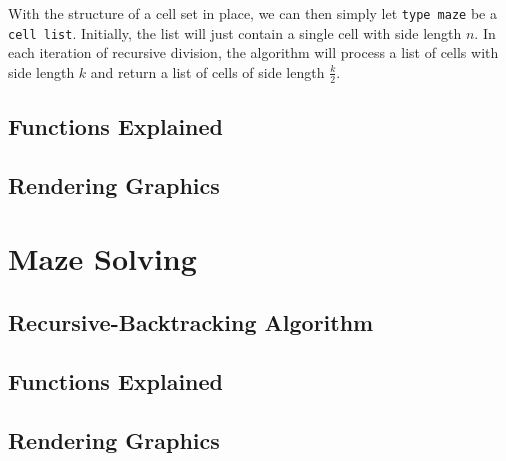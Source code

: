 \documentclass[11pt, margin=1in]{article}
\newcommand{\tab}{\par \qquad}
\begin{document}
\tab With the structure of a cell set in place, we can then simply let \texttt{type maze} be a \texttt{cell list}.  Initially, the list will just contain a single cell with side length $n$.  In each iteration of recursive division, the algorithm will process a list of cells with side length $k$ and return a list of cells of side length $\frac{k}{2}$.                   
   
\subsection{Functions Explained} %

\subsection{Rendering Graphics} %


\section{Maze Solving} 

\subsection{Recursive-Backtracking Algorithm} %

\subsection{Functions Explained} %

\subsection{Rendering Graphics} %
\end{document}
